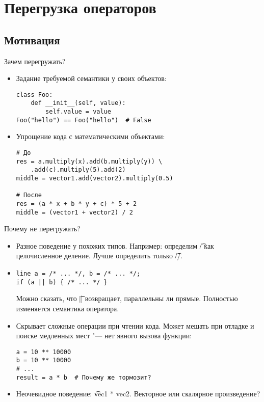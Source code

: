 \section{Перегрузка операторов}
\subsection{Мотивация}

\begin{frame}
	\tableofcontents[currentsection]
\end{frame}

\begin{frame}[fragile]{Зачем перегружать?}
	\begin{itemize}
		\item Задание требуемой семантики у своих объектов:	
\begin{verbatim}
class Foo:
    def __init__(self, value):
        self.value = value
Foo("hello") == Foo("hello")  # False
\end{verbatim}

		\item Упрощение кода с математическими объектами:
\begin{verbatim}
# До
res = a.multiply(x).add(b.multiply(y)) \
    .add(c).multiply(5).add(2)
middle = vector1.add(vector2).multiply(0.5)
	
# После
res = (a * x + b * y + c) * 5 + 2
middle = (vector1 + vector2) / 2
\end{verbatim}
	\end{itemize}
\end{frame}

\begin{frame}[fragile]{Почему не перегружать?}
	\pause
	\begin{itemize}
		\item
			Разное поведение у похожих типов.
			Например: определим \t{/} как целочисленное деление.
			Лучше определить только \t{//}.
			\pause
		\item
\begin{verbatim}
line a = /* ... */, b = /* ... */;
if (a || b) { /* ... */ }
\end{verbatim}
			\pause
			Можно сказать, что \t{||} возвращает, параллельны ли прямые.
			Полностью изменяется семантика оператора.
			\pause
		\item
			Скрывает сложные операции при чтении кода.
			Может мешать при отладке и поиске медленных мест "--- нет явного вызова функции:
\begin{verbatim}
a = 10 ** 10000
b = 10 ** 10000
# ...
result = a * b  # Почему же тормозит?
\end{verbatim}
		\item
			Неочевидное поведение: \t{vec1 * vec2}.
			\pause
			Векторное или скалярное произведение?
	\end{itemize}
\end{frame}

